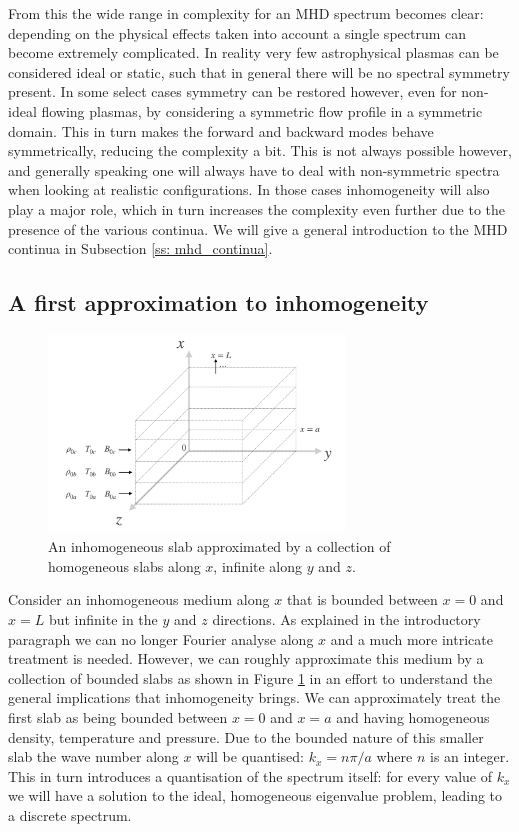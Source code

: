 From this the wide range in complexity for an MHD spectrum becomes clear: depending on the physical effects taken into account a single spectrum can become extremely complicated. In reality very few astrophysical plasmas can be considered ideal or static, such that in general there will be no spectral symmetry present. In some select cases symmetry can be restored however, even for non-ideal flowing plasmas, by considering a symmetric flow profile in a symmetric domain. This in turn makes the forward and backward modes behave symmetrically, reducing the complexity a bit. This is not always possible however, and generally speaking one will always have to deal with non-symmetric spectra when looking at realistic configurations. In those cases inhomogeneity will also play a major role, which in turn increases the complexity even further due to the presence of the various continua. We will give a general introduction to the MHD continua in Subsection \ref{ss: mhd_continua}.


\subsection{A first approximation to inhomogeneity}

\begin{figure}[b]
  \centering
  \includegraphics[width=0.7\textwidth]{confined_slab.png}
  \caption{
    An inhomogeneous slab approximated by a collection of homogeneous slabs along $x$, infinite along $y$ and $z$.
  }
  \label{fig: bounded_slab}
\end{figure}

Consider an inhomogeneous medium along $x$ that is bounded between $x = 0$ and $x = L$ but infinite in the $y$ and $z$ directions. As explained in the introductory paragraph we can no longer Fourier analyse along $x$ and a much more intricate treatment is needed. However, we can roughly approximate this medium by a collection of bounded slabs as shown in Figure \ref{fig: bounded_slab} in an effort to understand the general implications that inhomogeneity brings. We can approximately treat the first slab as being bounded between $x = 0$ and $x = a$ and having homogeneous density, temperature and pressure. Due to the bounded nature of this smaller slab the wave number along $x$ will be quantised: $k_x = n\pi / a$ where $n$ is an integer. This in turn introduces a quantisation of the spectrum itself: for every value of $k_x$ we will have a solution to the ideal, homogeneous eigenvalue problem, leading to a discrete spectrum.

